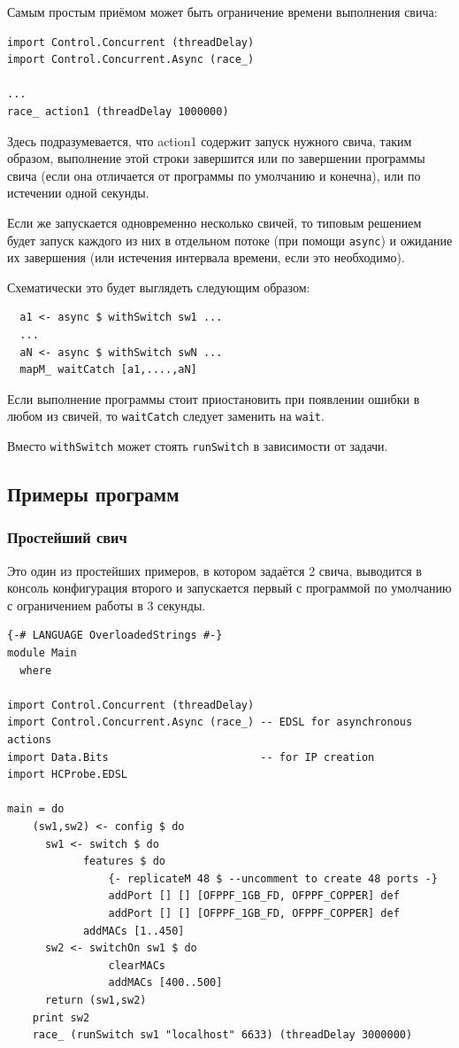 \documentclass[9pt,a4paper]{article}
\begin{document}
Самым простым приёмом может быть ограничение времени выполнения свича:

\begin{lstlisting}
import Control.Concurrent (threadDelay)
import Control.Concurrent.Async (race_)

...
race_ action1 (threadDelay 1000000)
\end{lstlisting}

Здесь подразумевается, что action1 содержит запуск нужного свича, таким образом,
выполнение этой строки завершится или по завершении программы свича (если она
отличается от программы по умолчанию и конечна), или по истечении одной секунды.

Если же запускается одновременно несколько свичей, то типовым решением будет
запуск каждого из них в отдельном потоке (при помощи \lstinline!async!) и
ожидание их завершения (или истечения интервала времени, если это необходимо).

Схематически это будет выглядеть следующим образом:

\begin{lstlisting}
  a1 <- async $ withSwitch sw1 ...
  ...
  aN <- async $ withSwitch swN ...
  mapM_ waitCatch [a1,....,aN]
\end{lstlisting}

Если выполнение программы стоит приостановить при появлении ошибки в любом из
свичей, то \lstinline!waitCatch! следует заменить на \lstinline!wait!.

Вместо \lstinline!withSwitch! может стоять \lstinline!runSwitch!
в зависимости от задачи.

\subsection{Примеры программ}

\subsubsection{Простейший свич}

Это один из простейших примеров, в котором задаётся 2 свича, выводится в консоль
конфигурация второго и запускается первый с программой по умолчанию с
ограничением работы в 3 секунды.

\begin{lstlisting}
{-# LANGUAGE OverloadedStrings #-}
module Main
  where

import Control.Concurrent (threadDelay)
import Control.Concurrent.Async (race_) -- EDSL for asynchronous actions
import Data.Bits                        -- for IP creation
import HCProbe.EDSL

main = do 
    (sw1,sw2) <- config $ do
      sw1 <- switch $ do
            features $ do
                {- replicateM 48 $ --uncomment to create 48 ports -}
                addPort [] [] [OFPPF_1GB_FD, OFPPF_COPPER] def
                addPort [] [] [OFPPF_1GB_FD, OFPPF_COPPER] def
            addMACs [1..450]
      sw2 <- switchOn sw1 $ do
                clearMACs 
                addMACs [400..500]
      return (sw1,sw2)
    print sw2
    race_ (runSwitch sw1 "localhost" 6633) (threadDelay 3000000)
\end{lstlisting}
\end{document}
